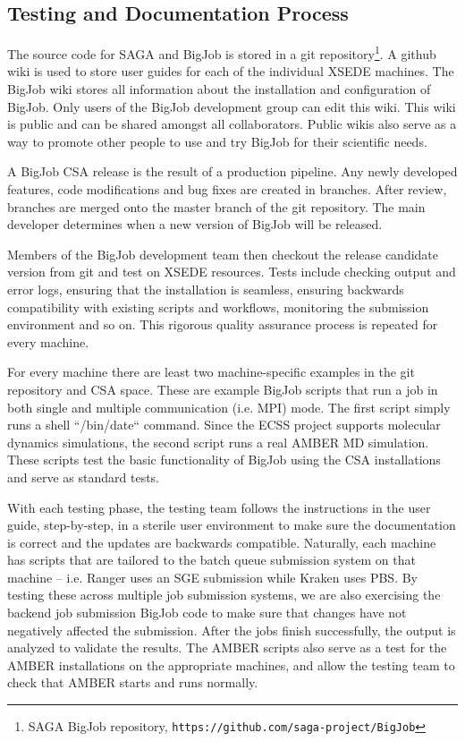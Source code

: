 \documentclass{sig-alternate}
\begin{document}
\subsection{Testing and Documentation Process}

The source code for SAGA and BigJob is stored in a git repository\footnote{
SAGA BigJob repository, {\texttt{https://github.com/saga-project/BigJob}}}.
A github wiki is used to store user guides for each of the individual XSEDE
machines. The BigJob wiki stores all information about the installation and
configuration of BigJob. Only users of the BigJob development group can edit
this wiki. This wiki is public and can be shared amongst all collaborators.
Public wikis also serve as a way to promote other people to use and try BigJob
for their scientific needs.

A BigJob CSA release is the result of a production pipeline. Any newly developed
features, code modifications and bug fixes are created in branches. After
review, branches are merged onto the master branch of the git repository. The
main developer determines when a new version of BigJob will be released. 

Members of the BigJob development team then checkout the release candidate
version from git and test on XSEDE resources. Tests include checking output and error logs, 
ensuring that the installation is seamless, ensuring backwards compatibility with existing 
scripts and workflows, monitoring the submission environment and so on. This rigorous quality 
assurance process is repeated for every machine.

For every machine there are least two machine-specific examples in the git
repository and CSA space. These are example BigJob scripts that run a job in
both single and multiple communication (i.e. MPI) mode. The first script simply
runs a shell ``/bin/date`` command. Since the ECSS project supports molecular
dynamics simulations, the second script runs a real AMBER MD simulation. These
scripts test the basic functionality of BigJob using the CSA installations and
serve as standard tests.

With each testing phase, the testing team follows the instructions in the user
guide, step-by-step, in a sterile user environment to make sure the
documentation is correct and the updates are backwards compatible.
Naturally, each machine has scripts that are tailored to the batch queue submission
system on that machine -- i.e. Ranger uses an SGE submission while Kraken uses
PBS. By testing these across multiple job submission systems, we are also
exercising the backend job submission BigJob code to make sure that changes have
not negatively affected the submission. After the jobs finish successfully, the
output is analyzed to validate the results. The AMBER scripts also serve as a
test for the AMBER installations on the appropriate machines, and allow the
testing team to check that AMBER starts and runs normally.
\end{document}
